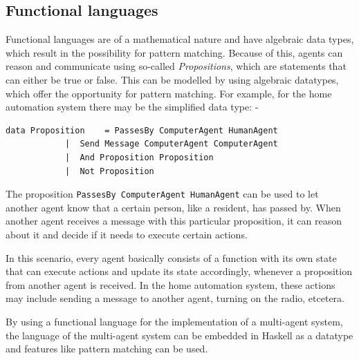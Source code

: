 \documentclass{sig-alternate-br}
\begin{document}
\subsection{Functional languages}
Functional languages are of a mathematical nature and have algebraic data types, which result in the possibility for pattern matching. Because of this, agents can reason and communicate using so-called {\it Propositions}, which are statements that can either be true or false. This can be modelled by using algebraic datatypes, which offer the opportunity for pattern matching.
For example, for the home automation system there may be the simplified data type:
-\begin{verbatim}
data Proposition	= PassesBy ComputerAgent HumanAgent
			|  Send Message ComputerAgent ComputerAgent
			|  And Proposition Proposition
			|  Not Proposition
\end{verbatim}
The proposition {\tt PassesBy ComputerAgent HumanAgent} can be used to let another agent know that a certain person, like a resident, has passed by. When another agent receives a message with this particular proposition, it can reason about it and decide if it needs to execute certain actions.

In this scenario, every agent basically consists of a function with its own state that can execute actions and update its state accordingly, whenever a proposition from another agent is received. In the home automation system, these actions may include sending a message to another agent, turning on the radio, etcetera.

By using a functional language for the implementation of a multi-agent system, the language of the multi-agent system can be embedded in Haskell as a datatype and features like pattern matching can be used.
\end{document}
